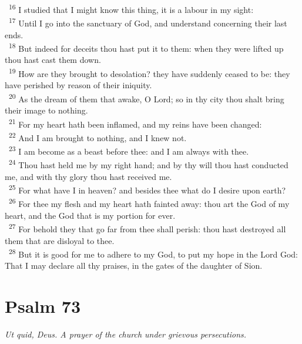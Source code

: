 \documentclass[a5paper,12pt]{article}
\begin{document}
\begin{multicols*}{2}
~\textsuperscript{16} I studied that I might know this thing, it is a labour in my sight:\\
~\textsuperscript{17} Until I go into the sanctuary of God, and understand concerning their last ends.\\
~\textsuperscript{18} But indeed for deceits thou hast put it to them: when they were lifted up thou hast cast them down.\\
~\textsuperscript{19} How are they brought to desolation? they have suddenly ceased to be: they have perished by reason of their iniquity.\\
~\textsuperscript{20} As the dream of them that awake, O Lord; so in thy city thou shalt bring their image to nothing.\\
~\textsuperscript{21} For my heart hath been inflamed, and my reins have been changed:\\
~\textsuperscript{22} And I am brought to nothing, and I knew not.\\
~\textsuperscript{23} I am become as a beast before thee: and I am always with thee.\\
~\textsuperscript{24} Thou hast held me by my right hand; and by thy will thou hast conducted me, and with thy glory thou hast received me.\\
~\textsuperscript{25} For what have I in heaven? and besides thee what do I desire upon earth?\\
~\textsuperscript{26} For thee my flesh and my heart hath fainted away: thou art the God of my heart, and the God that is my portion for ever.\\
~\textsuperscript{27} For behold they that go far from thee shall perish: thou hast destroyed all them that are disloyal to thee.\\
~\textsuperscript{28} But it is good for me to adhere to my God, to put my hope in the Lord God: That I may declare all thy praises, in the gates of the daughter of Sion.\\

\section{Psalm 73}
\label{sec:org64cbf79}
\emph{Ut quid, Deus. A prayer of the church under grievous persecutions.}\\


\end{multicols*}
\end{document}
